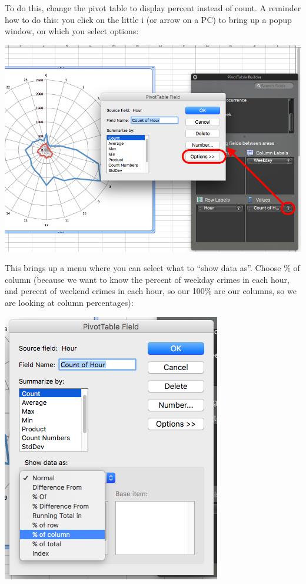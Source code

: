 \documentclass[]{book}
\theoremstyle{definition}
\theoremstyle{definition}
\theoremstyle{definition}
\theoremstyle{remark}
\begin{document}
To do this, change the pivot table to display percent instead of count.
A reminder how to do this: you click on the little i (or arrow on a PC)
to bring up a popup window, on which you select options:

\includegraphics{imgs/hr_r_26.png}

This brings up a menu where you can select what to ``show data as''.
Choose \% of column (because we want to know the percent of weekday
crimes in each hour, and percent of weekend crimes in each hour, so our
100\% are our columns, so we are looking at column percentages):

\includegraphics{imgs/hr_r_27.png}
\end{document}
